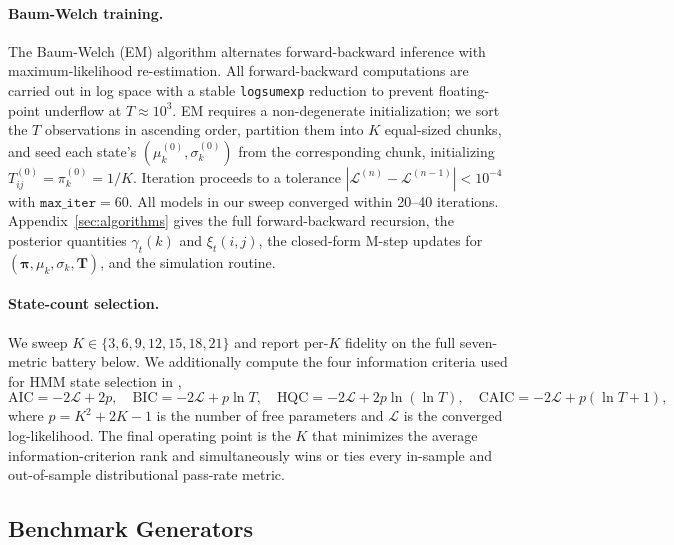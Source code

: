 \paragraph{Baum-Welch training.}
The Baum-Welch (EM) algorithm \cite{baum1970maximization} alternates forward-backward inference with maximum-likelihood re-estimation.
All forward-backward computations are carried out in log space with a stable \texttt{logsumexp} reduction \cite{bilmes1998gentle} to prevent floating-point underflow at $T \approx 10^{3}$.
EM requires a non-degenerate initialization; we sort the $T$ observations in ascending order, partition them into $K$ equal-sized chunks, and seed each state's $(\mu_k^{(0)}, \sigma_k^{(0)})$ from the corresponding chunk, initializing $T_{ij}^{(0)} = \pi_k^{(0)} = 1/K$.
Iteration proceeds to a tolerance $|\mathcal{L}^{(n)} - \mathcal{L}^{(n-1)}| < 10^{-4}$ with $\texttt{max\_iter} = 60$.
All models in our sweep converged within 20--40 iterations.
Appendix~\ref{sec:algorithms} gives the full forward-backward recursion, the posterior quantities $\gamma_t(k)$ and $\xi_t(i, j)$, the closed-form M-step updates for $(\boldsymbol{\pi}, \mu_k, \sigma_k, \mathbf{T})$, and the simulation routine.

\paragraph{State-count selection.}
We sweep $K \in \{3, 6, 9, 12, 15, 18, 21\}$ and report per-$K$ fidelity on the full seven-metric battery below.
We additionally compute the four information criteria used for HMM state selection in \citet{nguyen2018hidden},
\begin{equation}
    \text{AIC} = -2\mathcal{L} + 2p,\quad
    \text{BIC} = -2\mathcal{L} + p \ln T,\quad
    \text{HQC} = -2\mathcal{L} + 2p \ln(\ln T),\quad
    \text{CAIC} = -2\mathcal{L} + p(\ln T + 1),
    \label{eq:information_criteria}
\end{equation}
where $p = K^2 + 2K - 1$ is the number of free parameters and $\mathcal{L}$ is the converged log-likelihood.
The final operating point is the $K$ that minimizes the average information-criterion rank and simultaneously wins or ties every in-sample and out-of-sample distributional pass-rate metric.

\subsection{Benchmark Generators}
\label{sec:benchmarks}

